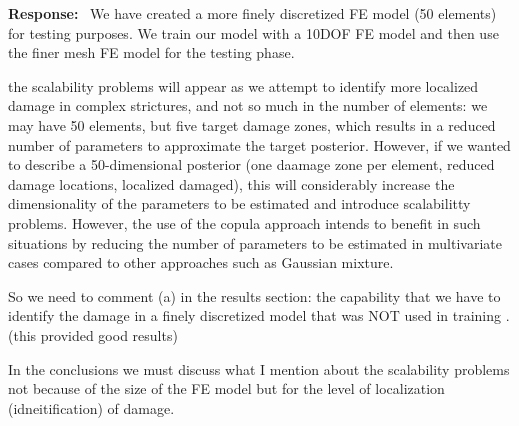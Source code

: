 \documentclass[11pt]{article}
\newenvironment{response}{\par\smallskip\noindent\color{resp}\textbf{Response:}\ }{\par}
\newenvironment{action}{\par\smallskip\noindent\color{resp}\textbf{Action:}\ }{\par}
\newcommand{\authornote}[1]{\textcolor{note}{\textsf{[Authors: #1]}}}
\newcommand{\tbd}[1]{\textcolor{note}{\textsf{[#1]}}}
\newcommand{\lines}[1]{\tbd{lines #1}}
\begin{document}
\begin{response}
We have created a more finely discretized FE model (50 elements) for testing purposes.
We train our model with a 10DOF FE model and then use the finer mesh FE model for the testing phase. 

the scalability problems will appear as we attempt to identify more localized damage in complex strictures, and not so much in the number of elements: we may have 50 elements, but five target damage zones, which results in a reduced number of parameters to approximate the target posterior. 
However, if we wanted to describe a 50-dimensional posterior (one daamage zone per element, reduced damage locations, localized damaged), this will considerably increase the dimensionality of the parameters to be estimated and introduce scalabilitty problems. However, the use of the copula approach intends to benefit in such situations by reducing the number of parameters to  be estimated in multivariate cases compared to other approaches such as Gaussian mixture.


So we need to comment (a) in the results section: the capability that we have to identify the damage in a finely discretized model that was NOT used in training . (this provided good results)

In the conclusions we must discuss what I mention about the scalability problems not because of the size of the FE model but for the level of localization (idneitification) of damage. 

%
\end{response}
%
\end{document}

